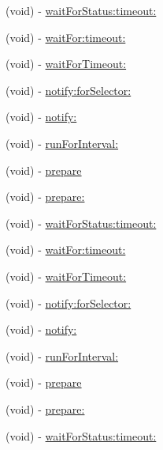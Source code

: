 \begin{DoxyCompactItemize}
\item 
(void) -\/ \hyperlink{interface_g_h_async_test_case_ae8781529003ebef3a06569c0157687ae}{wait\-For\-Status\-:timeout\-:}
\item 
(void) -\/ \hyperlink{interface_g_h_async_test_case_a43422127c8303a93f0ae39c883a2da06}{wait\-For\-:timeout\-:}
\item 
(void) -\/ \hyperlink{interface_g_h_async_test_case_aaf22dd45b3493e110362392cc3dc086b}{wait\-For\-Timeout\-:}
\item 
(void) -\/ \hyperlink{interface_g_h_async_test_case_ab1be43eb4f4909ce5607b51fa0a1f40b}{notify\-:for\-Selector\-:}
\item 
(void) -\/ \hyperlink{interface_g_h_async_test_case_ad21d6cdd1f2a284ee7b5ad5b6d1c82e2}{notify\-:}
\item 
(void) -\/ \hyperlink{interface_g_h_async_test_case_accbc972d3d516d1e53529c84fa2fc510}{run\-For\-Interval\-:}
\item 
(void) -\/ \hyperlink{interface_g_h_async_test_case_a8eda5b64c599e0c48bbd206840bd4cde}{prepare}
\item 
(void) -\/ \hyperlink{interface_g_h_async_test_case_a085b47a16f4a790d77ba78bd2eafb3ff}{prepare\-:}
\item 
(void) -\/ \hyperlink{interface_g_h_async_test_case_ae8781529003ebef3a06569c0157687ae}{wait\-For\-Status\-:timeout\-:}
\item 
(void) -\/ \hyperlink{interface_g_h_async_test_case_a43422127c8303a93f0ae39c883a2da06}{wait\-For\-:timeout\-:}
\item 
(void) -\/ \hyperlink{interface_g_h_async_test_case_aaf22dd45b3493e110362392cc3dc086b}{wait\-For\-Timeout\-:}
\item 
(void) -\/ \hyperlink{interface_g_h_async_test_case_ab1be43eb4f4909ce5607b51fa0a1f40b}{notify\-:for\-Selector\-:}
\item 
(void) -\/ \hyperlink{interface_g_h_async_test_case_ad21d6cdd1f2a284ee7b5ad5b6d1c82e2}{notify\-:}
\item 
(void) -\/ \hyperlink{interface_g_h_async_test_case_accbc972d3d516d1e53529c84fa2fc510}{run\-For\-Interval\-:}
\item 
(void) -\/ \hyperlink{interface_g_h_async_test_case_a8eda5b64c599e0c48bbd206840bd4cde}{prepare}
\item 
(void) -\/ \hyperlink{interface_g_h_async_test_case_a085b47a16f4a790d77ba78bd2eafb3ff}{prepare\-:}
\item 
(void) -\/ \hyperlink{interface_g_h_async_test_case_ae8781529003ebef3a06569c0157687ae}{wait\-For\-Status\-:timeout\-:}

\end{DoxyCompactItemize}

